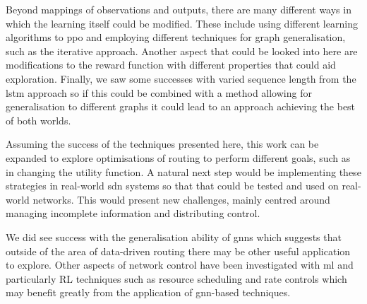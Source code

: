 Beyond mappings of observations and outputs, there are many different ways in which the learning itself could be modified. These include using different learning algorithms to \ac{ppo} and employing different techniques for graph generalisation, such as the iterative approach. Another aspect that could be looked into here are modifications to the reward function with different properties that could aid exploration. Finally, we saw some successes with varied sequence length from the \ac{lstm} approach so if this could be combined with a method allowing for generalisation to different graphs it could lead to an approach achieving the best of both worlds.

Assuming the success of the techniques presented here, this work can be expanded to explore optimisations of routing to perform different goals, such as in changing the utility function. A natural next step would be implementing these strategies in real-world \ac{sdn} systems so that that could be tested and used on real-world networks. This would present new challenges, mainly centred around managing incomplete information and distributing control.

We did see success with the generalisation ability of \acp{gnn} which suggests that outside of the area of data-driven routing there may be other useful application to explore. Other aspects of network control have been investigated with \ac{ml} and particularly RL techniques such as resource scheduling and rate controls which may benefit greatly from the application of \ac{gnn}-based techniques.

